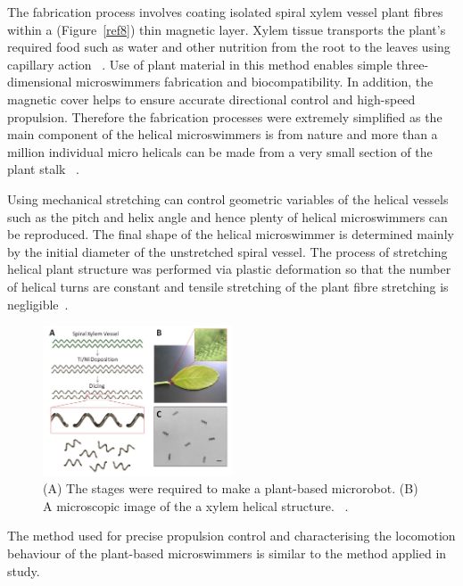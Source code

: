 \documentclass[12pt,a4paper,titlepage]{report}
\begin{document}
The fabrication process involves coating isolated spiral xylem vessel plant fibres within a (Figure~\ref{ref8})
thin magnetic layer. Xylem tissue transports the plant\rq{}s required food such as water and other 
nutrition from the root to the leaves using capillary action ~\citep{mahoney2011velocity}.
Use of plant material in this method enables simple three-dimensional microswimmers fabrication 
and biocompatibility. In addition, the magnetic cover helps to ensure accurate directional control and 
high-speed propulsion. Therefore the fabrication processes were extremely simplified as the main 
component of the helical microswimmers is from nature and more than a million individual micro helicals 
can be made from a very small section of the plant stalk ~\citep{mahoney2011velocity}. 


Using mechanical stretching can control geometric variables of the helical vessels such as the pitch and
 helix angle and hence plenty of helical microswimmers can be reproduced. The final shape of the 
helical microswimmer is determined mainly by the initial diameter of the unstretched spiral vessel. The
 process of stretching helical plant structure was performed via plastic deformation so that the number 
of helical turns are constant and tensile stretching of the plant fibre stretching is negligible~\citep{mahoney2011velocity}. 


\begin{figure}
  \begin{center}
    \includegraphics[width=0.5\textwidth]{plants2}
  \caption{(A) The stages were required to make a plant-based microrobot. (B) A microscopic image of the 
a xylem helical structure. ~\citep{gao2013bioinspired}.}
  \label{plants2}
\end{center}
\end{figure}


The method used for precise propulsion control and characterising the locomotion behaviour of the 
plant-based microswimmers is similar to the method applied in \citeauthor{gao2013bioinspired} study.
\end{document}
